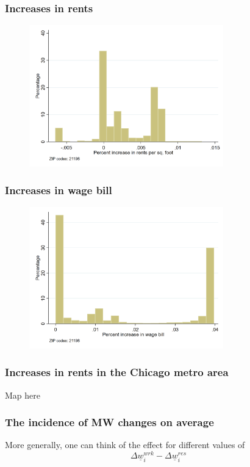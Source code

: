 \documentclass[aspectratio=169, t]{beamer}
\newcommand{\MW}{\underline{w}}
\begin{document}
\begin{frame}
	\frametitle{Increases in rents}
	\begin{figure}
		\includegraphics[width = 0.75\textwidth]{counterfactuals/output/perc_incr_rent.png}
	\end{figure}
\end{frame}

\begin{frame}
	\frametitle{Increases in wage bill}
	\begin{figure}
		\includegraphics[width = 0.75\textwidth]{counterfactuals/output/perc_incr_wagebill.png}
	\end{figure}
\end{frame}

\begin{frame}
	\frametitle{Increases in rents in the Chicago metro area}
	
	Map here
\end{frame}

\begin{frame}
	\frametitle{The incidence of MW changes on average}
	
    

	\pause
	\vspace{3mm}

	More generally, one can think of the effect for different values of 
	$$
		\Delta \MW_i^{wrk} - \Delta \MW_i^{res}
	$$
\end{frame}
\end{document}
